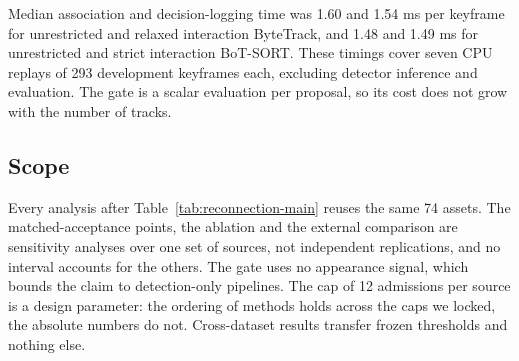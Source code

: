 Median association and decision-logging time was 1.60 and 1.54 ms per
keyframe for unrestricted and relaxed interaction ByteTrack, and 1.48 and
1.49 ms for unrestricted and strict interaction BoT-SORT. These timings
cover seven CPU replays of 293 development keyframes each, excluding
detector inference and evaluation. The gate is a scalar evaluation per
proposal, so its cost does not grow with the number of tracks.

\subsection{Scope}
Every analysis after Table~\ref{tab:reconnection-main} reuses the same 74
assets. The matched-acceptance points, the ablation and the external
comparison are sensitivity analyses over one set of sources, not
independent replications, and no interval accounts for the others. The
gate uses no appearance signal, which bounds the claim to detection-only
pipelines. The cap of 12 admissions per source is a design parameter: the
ordering of methods holds across the caps we locked, the absolute numbers
do not. Cross-dataset results transfer frozen thresholds and nothing else.
